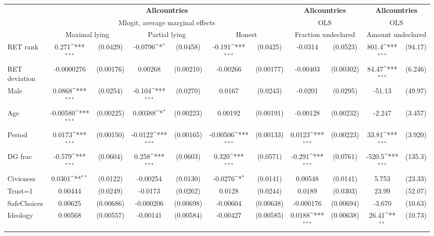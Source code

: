 \def\sym#1{\ifmmode^{#1}\else\(^{#1}\)\fi}
\begin{tabular}{l|cccccc|cc|cc}
\hline\hline
&\multicolumn{6}{c|}{\bf All\space{}countries}&\multicolumn{2}{c|}{\bf All\space{}countries}&\multicolumn{2}{c}{\bf All\space{}countries}\\ &\multicolumn{6}{c|}{Mlogit, average marginal effects }&\multicolumn{2}{c|}{OLS}&\multicolumn{2}{c}{OLS}\\
                &\multicolumn{2}{c}{Maximal lying}&\multicolumn{2}{c}{Partial lying}&\multicolumn{2}{c}{Honest}  &\multicolumn{2}{c}{Fraction undeclared}&\multicolumn{2}{c}{Amount undeclared}\\
\hline
RET rank        &    0.271\sym{***}& (0.0429)&  -0.0796\sym{*}  & (0.0458)&   -0.191\sym{***}& (0.0425)&  -0.0314         & (0.0523)&    801.4\sym{***}&  (94.17)\\
RET deviation   &-0.0000276         &(0.00176)&  0.00268         &(0.00210)& -0.00266         &(0.00177)& -0.00403         &(0.00302)&    84.47\sym{***}&  (6.246)\\
Male            &   0.0868\sym{***}& (0.0254)&   -0.104\sym{***}& (0.0270)&   0.0167         & (0.0243)&  -0.0201         & (0.0295)&   -51.13         &  (49.97)\\
Age             & -0.00580\sym{***}&(0.00225)&  0.00388\sym{*}  &(0.00223)&  0.00192         &(0.00191)& -0.00128         &(0.00232)&   -2.247         &  (3.457)\\
Period          &   0.0173\sym{***}&(0.00150)&  -0.0122\sym{***}&(0.00165)& -0.00506\sym{***}&(0.00133)&   0.0123\sym{***}&(0.00223)&    33.81\sym{***}&  (3.920)\\
DG frac         &   -0.579\sym{***}& (0.0604)&    0.258\sym{***}& (0.0603)&    0.320\sym{***}& (0.0571)&   -0.291\sym{***}& (0.0761)&   -520.5\sym{***}&  (135.3)\\
Civicness       &   0.0301\sym{**} & (0.0122)& -0.00254         & (0.0130)&  -0.0276\sym{*}  & (0.0141)&  0.00548         & (0.0141)&    5.753         &  (23.33)\\
Trust=1         &  0.00444         & (0.0249)&  -0.0173         & (0.0262)&   0.0128         & (0.0244)&   0.0189         & (0.0303)&    23.99         &  (52.07)\\
SafeChoices     &  0.00625         &(0.00686)&-0.000206         &(0.00698)& -0.00604         &(0.00638)&-0.000176         &(0.00694)&   -3.670         &  (10.63)\\
Ideology        &  0.00568         &(0.00557)& -0.00141         &(0.00584)& -0.00427         &(0.00585)&   0.0188\sym{***}&(0.00638)&    26.41\sym{**} &  (10.73)\\

\end{tabular}
